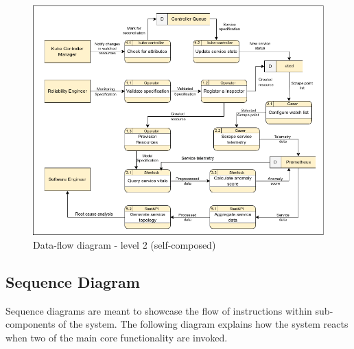 \begin{figure}[H]
    \includegraphics[width=13cm]{assets/system-design/data-flow-level-2.png}
    \caption{Data-flow diagram - level 2 (self-composed)}
\end{figure}


\subsection{Sequence Diagram}

Sequence diagrams are meant to showcase the flow of instructions within sub-components of the system. The following diagram explains how the system reacts when two of the main core functionality are invoked.

